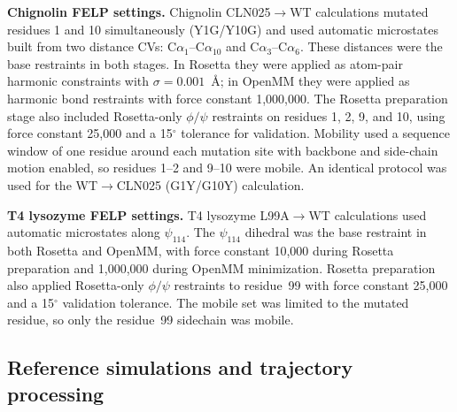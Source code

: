 \documentclass[journal=jctcce,manuscript=article,layout=twocolumn,hyperref=true]{achemso}
\begin{document}
	\textbf{Chignolin FELP settings.} Chignolin CLN025$\rightarrow$WT calculations mutated residues 1 and 10 simultaneously (Y1G/Y10G) and used automatic microstates built from two distance CVs: C$\alpha_1$--C$\alpha_{10}$ and C$\alpha_3$--C$\alpha_6$. These distances were the base restraints in both stages. In Rosetta they were applied as atom-pair harmonic constraints with $\sigma=0.001$~\AA; in OpenMM they were applied as harmonic bond restraints with force constant 1,000,000. The Rosetta preparation stage also included Rosetta-only $\phi/\psi$ restraints on residues 1, 2, 9, and 10, using force constant 25,000 and a 15$^\circ$ tolerance for validation. Mobility used a sequence window of one residue around each mutation site with backbone and side-chain motion enabled, so residues 1--2 and 9--10 were mobile. An identical protocol was used for the WT$\rightarrow$CLN025 (G1Y/G10Y) calculation.

	\textbf{T4 lysozyme FELP settings.} T4 lysozyme L99A$\rightarrow$WT calculations used automatic microstates along $\psi_{114}$. The $\psi_{114}$ dihedral was the base restraint in both Rosetta and OpenMM, with force constant 10,000 during Rosetta preparation and 1,000,000 during OpenMM minimization. Rosetta preparation also applied Rosetta-only $\phi/\psi$ restraints to residue~99 with force constant 25,000 and a 15$^\circ$ validation tolerance. The mobile set was limited to the mutated residue, so only the residue~99 sidechain was mobile.
	
	\subsection{Reference simulations and trajectory processing}
	
\end{document}
